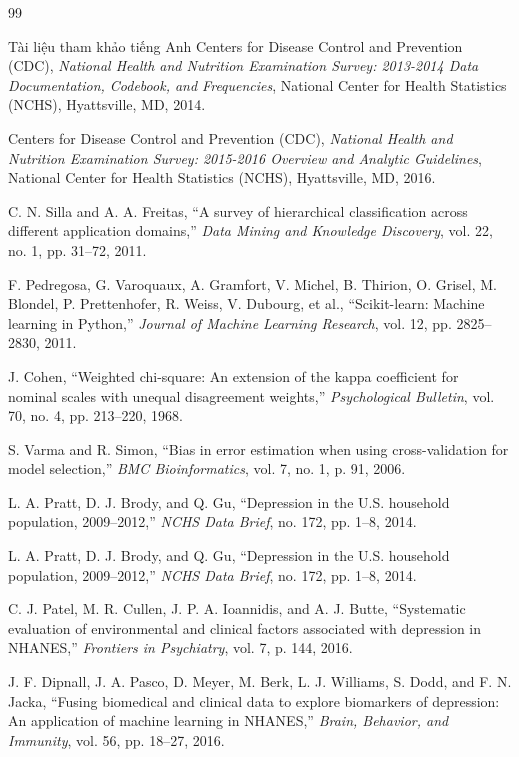 \documentclass{uetgraduation}
\begin{document}
\begin{thebibliography}{99}
\begin{bibsection}{Tài liệu tham khảo tiếng Anh}
    Centers for Disease Control and Prevention (CDC),
    \textit{National Health and Nutrition Examination Survey: 2013-2014 Data Documentation, Codebook, and Frequencies},
    National Center for Health Statistics (NCHS), Hyattsville, MD, 2014.

    Centers for Disease Control and Prevention (CDC),
    \textit{National Health and Nutrition Examination Survey: 2015-2016 Overview and Analytic Guidelines},
    National Center for Health Statistics (NCHS), Hyattsville, MD, 2016.

    C. N. Silla and A. A. Freitas,
    ``A survey of hierarchical classification across different application domains,''
    \textit{Data Mining and Knowledge Discovery}, vol. 22, no. 1, pp. 31--72, 2011.

    F. Pedregosa, G. Varoquaux, A. Gramfort, V. Michel, B. Thirion, O. Grisel, M. Blondel, P. Prettenhofer, R. Weiss, V. Dubourg, et al.,
    ``Scikit-learn: Machine learning in Python,''
    \textit{Journal of Machine Learning Research}, vol. 12, pp. 2825--2830, 2011.

    J. Cohen,
    ``Weighted chi-square: An extension of the kappa coefficient for nominal scales with unequal disagreement weights,''
    \textit{Psychological Bulletin}, vol. 70, no. 4, pp. 213--220, 1968.

    S. Varma and R. Simon,
    ``Bias in error estimation when using cross-validation for model selection,''
    \textit{BMC Bioinformatics}, vol. 7, no. 1, p. 91, 2006.

    L. A. Pratt, D. J. Brody, and Q. Gu,
    ``Depression in the {U.S.} household population, 2009--2012,''
    \textit{NCHS Data Brief}, no. 172, pp. 1--8, 2014.

    L. A. Pratt, D. J. Brody, and Q. Gu,
    ``Depression in the {U.S.} household population, 2009--2012,''
    \textit{NCHS Data Brief}, no. 172, pp. 1--8, 2014.

    C. J. Patel, M. R. Cullen, J. P. A. Ioannidis, and A. J. Butte,
    ``Systematic evaluation of environmental and clinical factors associated with depression in {NHANES},''
    \textit{Frontiers in Psychiatry}, vol. 7, p. 144, 2016.

    J. F. Dipnall, J. A. Pasco, D. Meyer, M. Berk, L. J. Williams, S. Dodd, and F. N. Jacka,
    ``Fusing biomedical and clinical data to explore biomarkers of depression: An application of machine learning in {NHANES},''
    \textit{Brain, Behavior, and Immunity}, vol. 56, pp. 18--27, 2016.


\end{bibsection}
\end{thebibliography}
\end{document}
